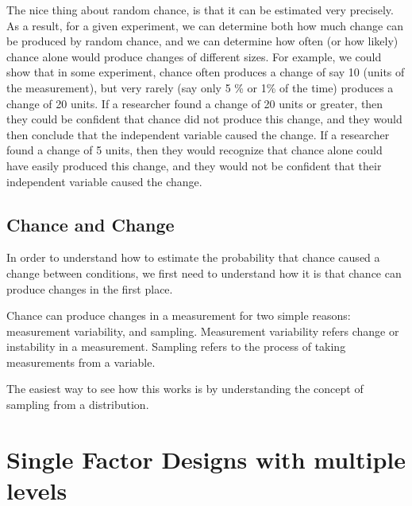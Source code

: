 The nice thing about random chance, is that it can be estimated very precisely. As a result, for a given experiment, we can determine both how much change can be produced by random chance, and we can determine how often (or how likely) chance alone would produce changes of different sizes. For example, we could show that in some experiment, chance  often produces a change of say 10 (units of the measurement), but very rarely (say only 5 \% or 1\% of the time) produces a change of 20 units. If a researcher found a change of 20 units or greater, then they could be confident that chance did not produce this change, and they would then conclude that the independent variable caused the change. If a researcher found a change of 5 units, then they would recognize that chance alone could have easily produced this change, and they would not be confident that their independent variable caused the change.

\subsection{Chance and Change}

In order to understand how to estimate the probability that chance caused a change between conditions, we first need to understand how it is that chance can produce changes in the first place. 

Chance can produce changes in a measurement for two simple reasons: measurement variability, and sampling. Measurement variability refers change or instability in a measurement. Sampling refers to the process of taking measurements from a variable.

The easiest way to see how this works is by understanding the concept of sampling from a distribution. 



\section{Single Factor Designs with multiple levels}



